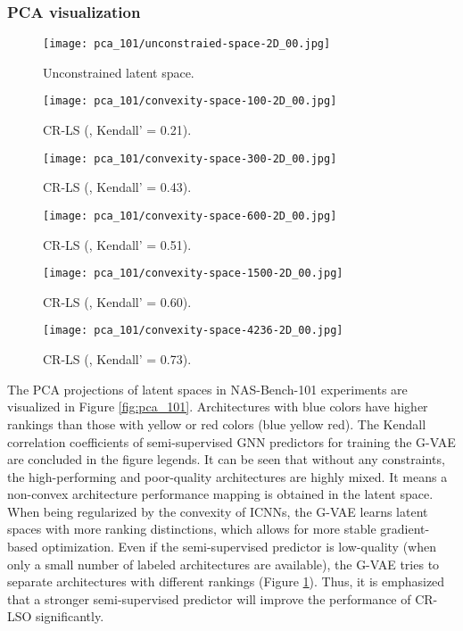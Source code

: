 \documentclass[10pt,twocolumn,letterpaper]{article}
\begin{document}
\subsubsection{PCA visualization}
\begin{figure*}
	\centering
	\begin{subfigure}{0.33 \linewidth}
		\texttt{[image: pca\_101/unconstraied-space-2D\_00.jpg]}
		\caption{Unconstrained latent space.}
	\end{subfigure}
	\begin{subfigure}{0.33 \linewidth}
		\texttt{[image: pca\_101/convexity-space-100-2D\_00.jpg]}
		\caption{CR-LS (, Kendall'  = 0.21).}
		\label{fig:pca_101_100}
	\end{subfigure}
	\begin{subfigure}{0.33 \linewidth}
	\texttt{[image: pca\_101/convexity-space-300-2D\_00.jpg]}
	\caption{CR-LS (, Kendall'  = 0.43).}
	\end{subfigure}
	\begin{subfigure}{0.33 \linewidth}
	\texttt{[image: pca\_101/convexity-space-600-2D\_00.jpg]}
	\caption{CR-LS (, Kendall'  = 0.51).}
	\end{subfigure}
	\begin{subfigure}{0.33 \linewidth}
	\texttt{[image: pca\_101/convexity-space-1500-2D\_00.jpg]}
	\caption{CR-LS (, Kendall'  = 0.60).}
	\end{subfigure}
	\begin{subfigure}{0.33 \linewidth}
	\texttt{[image: pca\_101/convexity-space-4236-2D\_00.jpg]}
	\caption{CR-LS (, Kendall'  = 0.73).}
	\end{subfigure}
	\caption{The PCA visualizations of unconstrained and convexity regularized latent spaces in NAS-Bench-101. The architectures with blue colors own higher rankings than those with yellow or red colors (blue  yellow  red).}
	\label{fig:pca_101}
\end{figure*} 
The PCA projections of latent spaces in NAS-Bench-101 experiments are visualized in Figure \ref{fig:pca_101}. Architectures with blue colors have higher rankings than those with yellow or red colors (blue  yellow  red). The Kendall correlation coefficients of semi-supervised GNN predictors for training the G-VAE are concluded in the figure legends. It can be seen that without any constraints, the high-performing and poor-quality architectures are highly mixed. It means a non-convex architecture performance mapping is obtained in the latent space. When being regularized by the convexity of ICNNs, the G-VAE learns latent spaces with more ranking distinctions, which allows for more stable gradient-based optimization. Even if the semi-supervised predictor is low-quality (when only a small number of labeled architectures are available), the G-VAE tries to separate architectures with different rankings (Figure \ref{fig:pca_101_100}). Thus, it is emphasized that a stronger semi-supervised predictor will improve the performance of CR-LSO significantly.  
\end{document}
